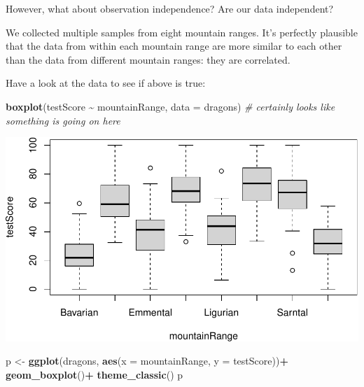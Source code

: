 \documentclass[
]{article}
\newenvironment{Shaded}{\begin{snugshade}}{\end{snugshade}}
\newcommand{\AttributeTok}[1]{\textcolor[rgb]{0.13,0.29,0.53}{#1}}
\newcommand{\CommentTok}[1]{\textcolor[rgb]{0.56,0.35,0.01}{\textit{#1}}}
\newcommand{\FunctionTok}[1]{\textcolor[rgb]{0.13,0.29,0.53}{\textbf{#1}}}
\newcommand{\NormalTok}[1]{#1}
\newcommand{\OtherTok}[1]{\textcolor[rgb]{0.56,0.35,0.01}{#1}}
\newcommand{\SpecialCharTok}[1]{\textcolor[rgb]{0.81,0.36,0.00}{\textbf{#1}}}
\begin{document}
However, what about observation independence? Are our data independent?

We collected multiple samples from eight mountain ranges. It's perfectly
plausible that the data from within each mountain range are more similar
to each other than the data from different mountain ranges: they are
correlated.

Have a look at the data to see if above is true:

\begin{Shaded}
\begin{Highlighting}[]
\FunctionTok{boxplot}\NormalTok{(testScore }\SpecialCharTok{\textasciitilde{}}\NormalTok{ mountainRange, }\AttributeTok{data =}\NormalTok{ dragons)   }\CommentTok{\# certainly looks like something is going on here}
\end{Highlighting}
\end{Shaded}

\includegraphics{Introduction-to-linear-mixed-models_files/figure-latex/unnamed-chunk-8-1.pdf}

\begin{Shaded}
\begin{Highlighting}[]
\NormalTok{p }\OtherTok{\textless{}{-}} \FunctionTok{ggplot}\NormalTok{(dragons, }\FunctionTok{aes}\NormalTok{(}\AttributeTok{x =}\NormalTok{ mountainRange, }\AttributeTok{y =}\NormalTok{ testScore))}\SpecialCharTok{+}
  \FunctionTok{geom\_boxplot}\NormalTok{()}\SpecialCharTok{+}
  \FunctionTok{theme\_classic}\NormalTok{()}
\NormalTok{p}
\end{Highlighting}
\end{Shaded}
\end{document}
